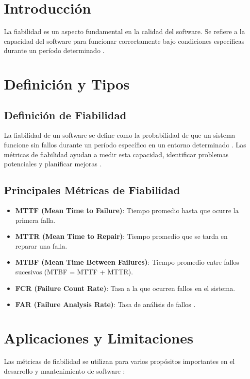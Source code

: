 \documentclass[a4,10pt]{article}
\begin{document}
\section{Introducción}
La fiabilidad es un aspecto fundamental en la calidad del software. Se refiere a la capacidad del software para funcionar correctamente bajo condiciones específicas durante un período determinado \cite{reliably2022}.

\section{Definición y Tipos}

\subsection{Definición de Fiabilidad}
La fiabilidad de un software se define como la probabilidad de que un sistema funcione sin fallos durante un período específico en un entorno determinado \cite{reliably2022}. Las métricas de fiabilidad ayudan a medir esta capacidad, identificar problemas potenciales y planificar mejoras \cite{javatpoint2022}.

\subsection{Principales Métricas de Fiabilidad}
\begin{itemize}
    \item \textbf{MTTF (Mean Time to Failure)}: Tiempo promedio hasta que ocurre la primera falla.
    \item \textbf{MTTR (Mean Time to Repair)}: Tiempo promedio que se tarda en reparar una falla.
    \item \textbf{MTBF (Mean Time Between Failures)}: Tiempo promedio entre fallos sucesivos (MTBF = MTTF + MTTR).
    \item \textbf{FCR (Failure Count Rate)}: Tasa a la que ocurren fallos en el sistema.
    \item \textbf{FAR (Failure Analysis Rate)}: Tasa de análisis de fallos \cite{reliably2022}.
\end{itemize}

\section{Aplicaciones y Limitaciones}
Las métricas de fiabilidad se utilizan para varios propósitos importantes en el desarrollo y mantenimiento de software \cite{reliably2022}:
\end{document}

